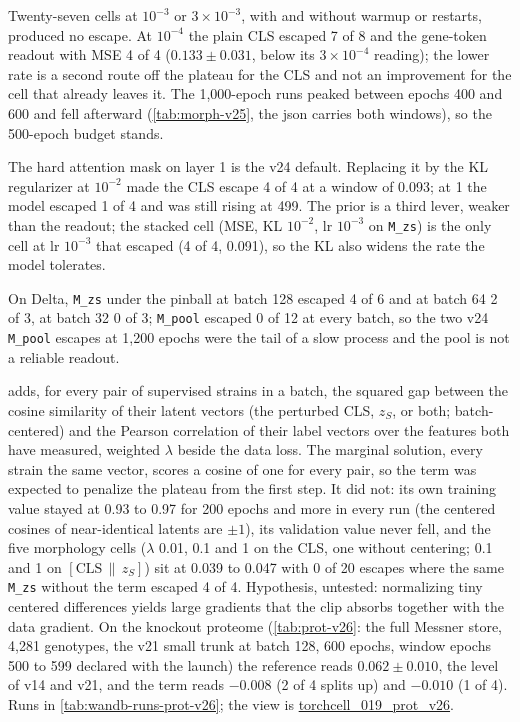  Twenty-seven cells at $10^{-3}$ or $3\times10^{-3}$, with and without
warmup or restarts, produced no escape. At $10^{-4}$ the plain CLS escaped 7 of 8 and the
gene-token readout with MSE 4 of 4 ($0.133 \pm 0.031$, below its $3\times10^{-4}$ reading);
the lower rate is a second route off the plateau for the CLS and not an improvement for
the cell that already leaves it. The 1{,}000-epoch runs peaked between epochs 400 and 600
and fell afterward (\cref{tab:morph-v25}, the json carries both windows), so the 500-epoch
budget stands.

 The hard attention mask on layer 1 is the v24 default. Replacing it by
the KL regularizer at $10^{-2}$ made the CLS escape 4 of 4 at a window of 0.093; at 1 the
model escaped 1 of 4 and was still rising at 499. The prior is a third lever, weaker than the
readout; the stacked cell (MSE, KL $10^{-2}$, lr $10^{-3}$ on \texttt{M\_zs}) is the only cell
at lr $10^{-3}$ that escaped (4 of 4, 0.091), so the KL also widens the rate the model
tolerates.

 On Delta, \texttt{M\_zs} under the pinball at batch 128 escaped 4 of 6 and at
batch 64 2 of 3, at batch 32 0 of 3; \texttt{M\_pool} escaped 0 of 12 at every batch, so the
two v24 \texttt{M\_pool} escapes at 1{,}200 epochs were the tail of a slow process and the
pool is not a reliable readout.

\label{sec:align}
 adds, for every pair of supervised strains in a batch,
the squared gap between the cosine similarity of their latent vectors (the perturbed CLS,
$z_S$, or both; batch-centered) and the Pearson correlation of their label vectors over the
features both have measured, weighted $\lambda$ beside the data loss. The marginal
solution, every strain the same vector, scores a cosine of one for every pair, so the term
was expected to penalize the plateau from the first step. It did not: its own training value
stayed at 0.93 to 0.97 for 200 epochs and more in every run (the centered cosines of
near-identical latents are $\pm 1$), its validation value never fell, and the five morphology
cells ($\lambda$ 0.01, 0.1 and 1 on the CLS, one without centering; 0.1 and 1 on
$[\mathrm{CLS} \,\|\, z_S]$) sit at 0.039 to 0.047 with 0 of 20 escapes where the same
\texttt{M\_zs} without the term escaped 4 of 4. Hypothesis, untested: normalizing tiny
centered differences yields large gradients that the clip absorbs together with the data
gradient. On the knockout proteome (\cref{tab:prot-v26}: the full Messner store, 4{,}281
genotypes, the v21 small trunk at batch 128, 600 epochs, window epochs 500 to 599 declared
with the launch) the reference reads $0.062 \pm 0.010$, the level of v14 and v21, and the
term reads $-0.008$ (2 of 4 splits up) and $-0.010$ (1 of 4). Runs in
\cref{tab:wandb-runs-prot-v26}; the view is
\href{https://wandb.ai/zhao-group/torchcell_019_prot_v26?nw=9nsa6vtv42n}{torchcell\_019\_prot\_v26}.

